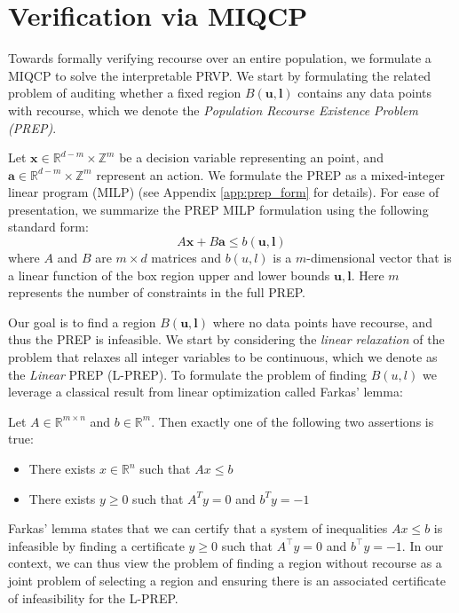 \section{Verification via MIQCP} \label{sec:method}
Towards formally verifying recourse over an entire population, we formulate a MIQCP to solve the interpretable PRVP. We start by formulating the related problem of auditing whether a fixed region $B(\mathbf{u}, \mathbf{l})$ contains any data points with recourse, which we denote the \emph{Population Recourse Existence Problem (PREP)}. 

Let $\mathbf{x} \in \mathbb{R}^{d-m} \times \mathbb{Z}^m$ be a decision variable representing an  point, and $\mathbf{a} \in \mathbb{R}^{d-m} \times \mathbb{Z}^m$ represent an action. We formulate the PREP as a mixed-integer linear program (MILP) (see Appendix \ref{app:prep_form} for details). For ease of presentation, we summarize the PREP MILP formulation using the following standard form:
$$
A\mathbf{x} + B\mathbf{a} \leq b(\mathbf{u}, \mathbf{l})
$$
where $A$ and $B$ are $m \times d$ matrices and $b(u,l)$ is a $m$-dimensional vector that is a linear function of the box region upper and lower bounds $\mathbf{u}, \mathbf{l}$. Here $m$ represents the number of constraints in the full PREP.

Our goal is to find a region $B(\mathbf{u}, \mathbf{l})$ where no data points have recourse, and thus the PREP is infeasible. We start by considering the \emph{linear relaxation} of the problem that relaxes all integer variables to be continuous, which we denote as the \emph{Linear} PREP (L-PREP). To formulate the problem of finding $B(u, l)$ we leverage a classical result from linear optimization called Farkas' lemma: 

\begin{theorem}
Let $A \in \mathbb{R}^{m \times n}$ and $b \in \mathbb{R}^m$. Then exactly one of the following two assertions is true:
\begin{itemize}
    \item There exists $x \in \mathbb{R}^n$ such that $Ax \leq b$
    \item There exists $y \geq 0$ such that $A^T y = 0$ and $b^T y = -1$
\end{itemize}
\end{theorem}

Farkas' lemma states that we can certify that a system of inequalities $Ax \leq b$ is infeasible by finding a certificate $y \geq 0$ such that $A^\top y = 0$ and $b^\top y = -1$. In our context, we can thus view the problem of finding a region without recourse as a joint problem of selecting a region and ensuring there is an associated certificate of infeasibility for the L-PREP. 

